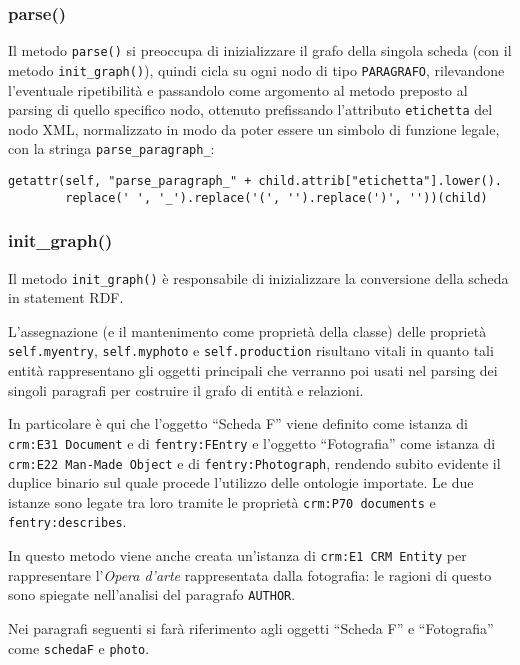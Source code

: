\subsubsection{parse()}
Il metodo \texttt{parse()} si preoccupa di inizializzare il grafo della singola scheda (con il metodo \texttt{init\_graph()}), quindi cicla su ogni nodo di tipo \texttt{PARAGRAFO}, rilevandone l'eventuale ripetibilità e passandolo come argomento al metodo preposto al parsing di quello specifico nodo, ottenuto prefissando l'attributo \texttt{etichetta} del nodo XML, normalizzato in modo da poter essere un simbolo di funzione legale, con la stringa \texttt{parse\_paragraph\_}:
\begin{Verbatim}[fontsize=\footnotesize]
getattr(self, "parse_paragraph_" + child.attrib["etichetta"].lower().
        replace(' ', '_').replace('(', '').replace(')', ''))(child)
\end{Verbatim}

\subsubsection{init\_graph()}
Il metodo \texttt{init\_graph()} è responsabile di inizializzare la conversione della scheda in statement RDF.

L'assegnazione (e il mantenimento come proprietà della classe) delle proprietà \texttt{self.myentry}, \texttt{self.myphoto} e \texttt{self.production} risultano vitali in quanto tali entità rappresentano gli oggetti principali che verranno poi usati nel parsing dei singoli paragrafi per costruire il grafo di entità e relazioni.

In particolare è qui che l'oggetto ``Scheda F'' viene definito come istanza di \texttt{crm:E31 Document} e di \texttt{fentry:FEntry} e l'oggetto ``Fotografia'' come istanza di \texttt{crm:E22 Man-Made Object} e di \texttt{fentry:Photograph}, rendendo subito evidente il duplice binario sul quale procede l'utilizzo delle ontologie importate. Le due istanze sono legate tra loro tramite le proprietà \texttt{crm:P70 documents} e \texttt{fentry:describes}.

In questo metodo viene anche creata un'istanza di \texttt{crm:E1 CRM Entity} per rappresentare l'\emph{Opera d'arte} rappresentata dalla fotografia: le ragioni di questo sono spiegate nell'analisi del paragrafo \texttt{AUTHOR}.

Nei paragrafi seguenti si farà riferimento agli oggetti ``Scheda F'' e ``Fotografia'' come \texttt{schedaF} e \texttt{photo}.

